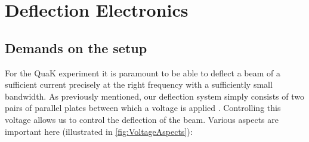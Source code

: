 
\chapter{Deflection Electronics}

\section{Demands on the setup}

For the QuaK experiment it is paramount to be able to deflect a beam of a sufficient current precisely at the right frequency with a sufficiently small bandwidth. 
As previously mentioned, our deflection system simply consists of two pairs of parallel plates between which a voltage is applied . Controlling this voltage allows us to control the deflection of the beam. Various aspects are important here (illustrated in \cref{fig:VoltageAspects}):

